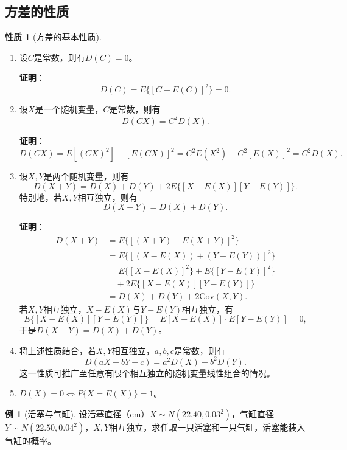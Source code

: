 \documentclass[11pt,a4paper]{report}
\theoremstyle{definition}
\newtheorem{example}{例}[chapter]
\newtheorem{property}{性质}[chapter]
\begin{document}
\subsection{方差的性质}

\begin{property}[方差的基本性质]
\begin{enumerate}[label=\arabic*.,leftmargin=2em]
    \item 设$C$是常数，则有$D(C)=0$。
    
    \textbf{证明}：
    \[
    D(C)=E\{[C-E(C)]^{2}\}=0.
    \]
    
    \item 设$X$是一个随机变量，$C$是常数，则有
    \[
    D(CX)=C^{2}D(X).
    \]
    
    \textbf{证明}：
    \[
    D(CX)=E[(CX)^{2}]-[E(CX)]^{2}=C^{2}E(X^{2})-C^{2}[E(X)]^{2}=C^{2}D(X).
    \]
    
    \item 设$X,Y$是两个随机变量，则有
    \[
    D(X+Y)=D(X)+D(Y)+2E\{[X-E(X)][Y-E(Y)]\}.
    \]
    特别地，若$X,Y$相互独立，则有
    \[
    D(X+Y)=D(X)+D(Y).
    \]
    
    \textbf{证明}：
    \begin{align*}
    D(X+Y)&=E\{[(X+Y)-E(X+Y)]^{2}\}\\
    &=E\{[(X-E(X))+(Y-E(Y))]^{2}\}\\
    &=E\{[X-E(X)]^{2}\}+E\{[Y-E(Y)]^{2}\}\\
    &\quad+2E\{[X-E(X)][Y-E(Y)]\}\\
    &=D(X)+D(Y)+2\mathrm{Cov}(X,Y).
    \end{align*}
    若$X,Y$相互独立，$X-E(X)$与$Y-E(Y)$相互独立，有
    \[
    E\{[X-E(X)][Y-E(Y)]\}=E[X-E(X)]\cdot E[Y-E(Y)]=0,
    \]
    于是$D(X+Y)=D(X)+D(Y)$。
    
    \item 将上述性质结合，若$X,Y$相互独立，$a,b,c$是常数，则有
    \[
    D(aX+bY+c)=a^{2}D(X)+b^{2}D(Y).
    \]
    这一性质可推广至任意有限个相互独立的随机变量线性组合的情况。
    
    \item $D(X)=0\Leftrightarrow P\{X=E(X)\}=1$。
\end{enumerate}
\end{property}

\begin{example}[活塞与气缸]
设活塞直径（cm）$X\sim N(22.40,0.03^{2})$，气缸直径$Y\sim N(22.50,0.04^{2})$，$X,Y$相互独立，求任取一只活塞和一只气缸，活塞能装入气缸的概率。
\end{example}
\end{document}
